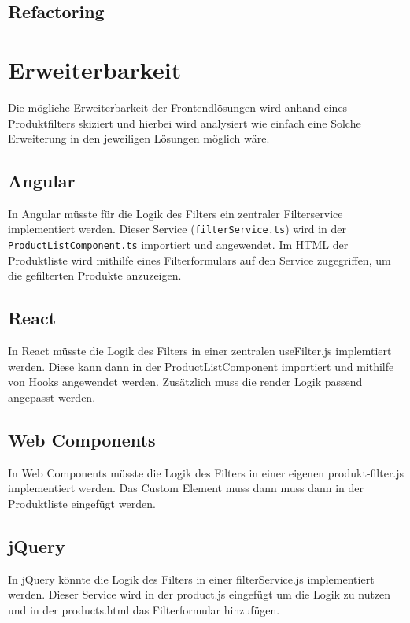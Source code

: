 \documentclass[oneside]{ausarbeitung}
\begin{document}
\subsection{Refactoring}

\section{Erweiterbarkeit}

Die mögliche Erweiterbarkeit der Frontendlösungen wird anhand eines Produktfilters skiziert und hierbei wird analysiert wie einfach eine Solche Erweiterung in den jeweiligen Lösungen möglich wäre. 

\subsection{Angular}

In Angular müsste für die Logik des Filters ein zentraler Filterservice implementiert werden. Dieser Service (\texttt{filterService.ts}) wird in der \texttt{ProductListComponent.ts} importiert und angewendet. Im HTML der Produktliste wird mithilfe eines Filterformulars auf den Service zugegriffen, um die gefilterten Produkte anzuzeigen.

\subsection{React}

In React müsste die Logik des Filters in einer zentralen useFilter.js implemtiert werden. Diese kann dann in der ProductListComponent importiert und mithilfe von Hooks angewendet werden. Zusätzlich muss die render Logik passend angepasst werden. 

\subsection{Web Components}

In Web Components müsste die Logik des Filters in einer eigenen produkt-filter.js implementiert werden. Das Custom Element muss dann muss dann in der Produktliste eingefügt werden. 

\subsection{jQuery}

In jQuery könnte die Logik des Filters in einer filterService.js implementiert werden. 
Dieser Service wird in der product.js eingefügt um die Logik zu nutzen und in der products.html das Filterformular hinzufügen. 
\end{document}
